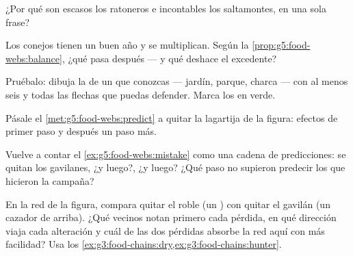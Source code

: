 \begin{exercise}[$\star$]\label{exo:g5:food-webs:6}
¿Por qué son escasos los ratoneros e incontables los saltamontes, en
una sola frase?
\end{exercise}

\begin{exercise}[$\star$]\label{exo:g5:food-webs:7}
Los conejos tienen un buen año y se multiplican. Según la
\cref{prop:g5:food-webs:balance}, ¿qué pasa después --- y qué deshace
el excedente?
\end{exercise}

\begin{exercise}[$\star$]\label{exo:g5:food-webs:8}
Pruébalo: dibuja la  de un  que conozcas ---
jardín, parque, charca --- con al menos seis  y todas las
flechas que puedas defender. Marca los  en verde.
\end{exercise}

\begin{exercise}[$\star\star$]\label{exo:g5:food-webs:9}
Pásale el \cref{met:g5:food-webs:predict} a quitar la lagartija de la
figura: efectos de primer paso y después un paso más.
\end{exercise}

\begin{exercise}[$\star\star$]\label{exo:g5:food-webs:10}
Vuelve a contar el \cref{ex:g5:food-webs:mistake} como una cadena de
predicciones: se quitan los gavilanes, ¿y luego?, ¿y luego? ¿Qué paso
no supieron predecir los que hicieron la campaña?
\end{exercise}

\begin{exercise}[$\star\star\star$]\label{exo:g5:food-webs:11}
En la red de la figura, compara quitar el roble (un ) con
quitar el gavilán (un cazador de arriba). ¿Qué vecinos notan primero
cada pérdida, en qué dirección viaja cada alteración y cuál de las dos
pérdidas absorbe la red aquí con más facilidad? Usa los
\cref{ex:g3:food-chains:dry,ex:g3:food-chains:hunter}.
\end{exercise}

